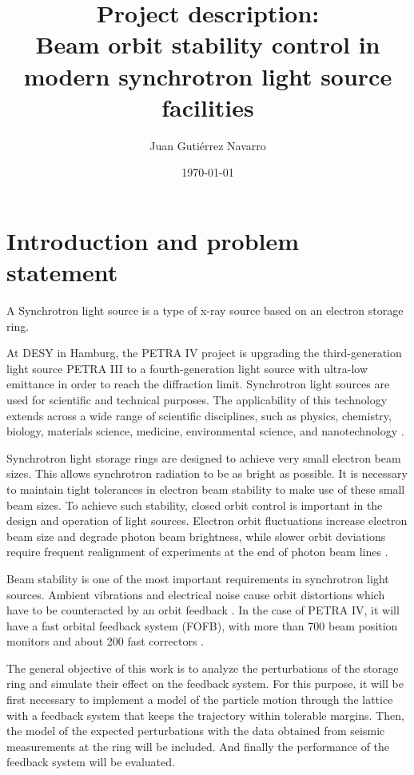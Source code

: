 \documentclass[12pt]{article}
\title{\textbf{Project description:} \\
\vspace{0.5cm} 
Beam orbit stability control in modern synchrotron light source facilities}
\author{Juan Gutiérrez Navarro}
\date{\today}
\begin{document}
\maketitle
\setlength{\parindent}{0pt}
\setlength{\parskip}{1em}

\section{Introduction and problem statement}
A Synchrotron light source is a type of x-ray source based on an electron storage ring.

At DESY in Hamburg, the PETRA IV project is upgrading the third-generation light source PETRA III to a fourth-generation light source  with ultra-low emittance in order to reach the diffraction limit. Synchrotron light sources  are used for scientific and technical purposes. The applicability of this technology extends  across a wide range of scientific disciplines, such as physics, chemistry, biology, materials  science, medicine, environmental science, and nanotechnology \cite{Schroer:426140}. 

Synchrotron light storage rings are designed to achieve very small electron beam sizes. This 
allows synchrotron radiation to be as bright as possible. It is necessary to maintain tight 
tolerances in electron beam stability to make use of these small beam sizes. To achieve 
such stability, closed orbit control is important in the design and operation of light sources. 
Electron orbit fluctuations increase electron beam size and degrade photon beam brightness, while slower orbit deviations require frequent realignment of experiments at the end of photon beam lines \cite{Safranek:1999fr}. 

Beam stability is one of the most important requirements in synchrotron light sources. Ambient vibrations and electrical noise cause orbit distortions which have to be counteracted 
by an orbit feedback \cite{sahoo2004closed}. In the case of PETRA IV, it will have a fast orbital feedback system (FOFB), with more than 700 beam position monitors and about 200 fast correctors \cite{Schroer:426140}.

The general objective of this work is to analyze the perturbations of the storage ring and simulate their effect on the feedback system.
For this purpose, it will be first necessary to implement a model of the particle motion through the lattice with a  feedback system that keeps the trajectory within tolerable margins. Then, the model of the expected perturbations with the data obtained from seismic measurements at the ring will be included. And finally the performance of the feedback system will be evaluated.
\end{document}
